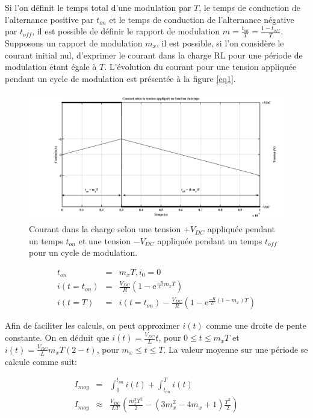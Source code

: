 Si l'on définit le temps total d'une modulation par $T$, le temps de conduction de l'alternance positive par $t_{on}$ et le temps de conduction de l'alternance négative par $t_{off}$, il est possible de définir le rapport de modulation $m = \frac{t_{on}}{T} = \frac{1-t_{off}}{T}$. Supposons un rapport de modulation $m_x$, il est possible, si l'on considère le courant initial nul, d'exprimer le courant dans la charge RL pour une période de modulation étant égale à $T$. L'évolution du courant pour une tension appliquée pendant un cycle de modulation est présentée à la figure \ref{eq1}.
\begin{figure}
\centering
\includegraphics[scale=0.4]{fig/fig_courant_tension_mod.png}
\caption{Courant dans la charge selon une tension $+V_{DC}$ appliquée pendant un temps $t_{on}$ et une tension $-V_{DC}$ appliquée pendant un temps $t_{off}$ pour un cycle de modulation.}
\end{figure}
\begin{eqnarray}
t_{on} &=& m_x T, i_0 = 0\\
i\left(t = t_{on}\right) &=& \frac{V_{DC}}{R}\left(1 - \mbox{e}^{\frac{-R}{L}m_x T}\right)\\
i\left(t = T\right) &=& i\left(t = t_{on}\right) -  \frac{V_{DC}}{R}\left(1 - \mbox{e}^{\frac{-R}{L}(1-m_x)T}\right)
\end{eqnarray}

Afin de faciliter les calculs, on peut approximer $i(t)$ comme une droite de pente constante. On en déduit que $i(t) = \frac{V_{DC}}{L}t$, pour $0\leq t \leq m_x T$ et $i(t) = \frac{V_{DC}}{L} m_x T \left( 2 - t\right)$, pour $m_x\leq t \leq T$. La valeur moyenne sur une période se calcule comme suit:

\begin{eqnarray}
I_{moy} &=& \int_0^{t_{on}} i(t) + \int_{t_{on}}^{T} i(t)\\\label{eq_Imoy}
I_{moy} &\approx & \frac{V_{DC}}{LT}\left(\frac{m_x^2 T^2}{2} -(3m_x^2 -4m_x +1)\frac{T^2}{2}\right)
\end{eqnarray}

